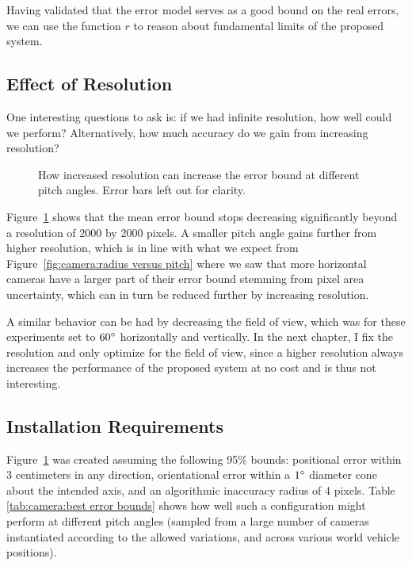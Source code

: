 \documentclass[a4paper,12pt,twoside,openright]{report}
\begin{document}
Having validated that the error model serves as a good bound on the real errors, we can use the function $r$
to reason about fundamental limits of the proposed system.

\subsection{Effect of Resolution}

One interesting questions to ask is: if we had infinite resolution,
how well could we perform? Alternatively, how much accuracy do we gain from increasing resolution?

\begin{figure}[htb]
    \begin{center}
        
    \end{center}
    \caption[Resolution Limits]{How increased resolution can increase the error bound at different pitch angles. Error bars left out for clarity.}
    \label{fig:camera:resolution}
\end{figure}

Figure~\ref{fig:camera:resolution} shows that the mean error bound stops decreasing
significantly beyond a resolution of 2000 by 2000 pixels. A smaller pitch 
angle gains further from higher resolution, which is in line with what we 
expect from Figure~\ref{fig:camera:radius versus pitch} where we saw that more horizontal cameras
have a larger part of their error bound stemming from pixel area uncertainty,
which can in turn be reduced further by increasing resolution.

A similar behavior can be had by decreasing the field of view, which was for
these experiments set to $60\degree$ horizontally and vertically. 
In the next chapter, I fix the resolution and only optimize for the field of view,
since a higher resolution always increases the performance
of the proposed system at no cost and is thus not interesting.

\subsection{Installation Requirements}

Figure~\ref{fig:camera:resolution} was created assuming the following 95\% bounds: positional error
within 3 centimeters in any direction, orientational error within a
$1\degree$ diameter cone about the intended axis, 
and an algorithmic inaccuracy radius of 4 pixels. Table \ref{tab:camera:best error bounds}
shows how well such a configuration might perform at different pitch angles (sampled from
a large number of cameras instantiated according to the allowed variations,
and across various world vehicle positions). 
\end{document}
